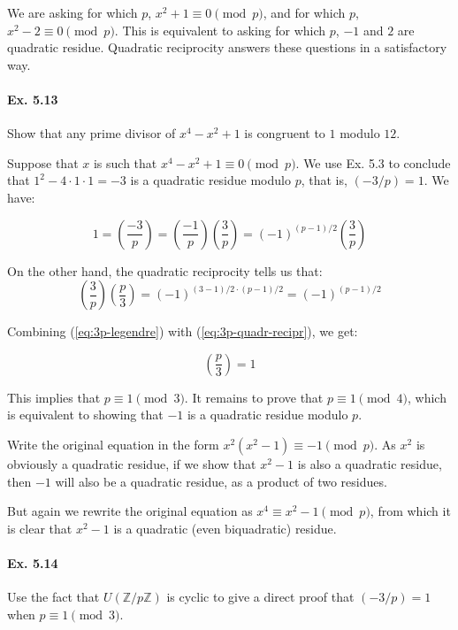 \documentclass[notitlepage]{article}
\theoremstyle{definition}
\newcommand\Z{\mathbb{Z}}
\begin{document}
We are asking for which $p$, $x^2 + 1 \equiv 0 \pmod p$, and for which
$p$, $x^2 - 2 \equiv 0 \pmod p$. This is equivalent to asking for
which $p$, $-1$ and $2$ are quadratic residue. Quadratic reciprocity
answers these questions in a satisfactory way.

\paragraph{Ex. 5.13}
Show that any prime divisor of $x^4 - x^2 + 1$ is congruent to $1$
modulo $12$.

Suppose that $x$ is such that $x^4 - x^2 + 1 \equiv 0 \pmod p$. We use
Ex. 5.3 to conclude that $1^2 - 4 \cdot 1 \cdot 1 = - 3$ is a
quadratic residue modulo $p$, that is, $(-3/p) = 1$. We have:

\begin{equation}
  \label{eq:3p-legendre}
  1 = \left(\frac{-3}{p}\right) =
  \left(\frac{-1}{p}\right)\left(\frac{3}{p}\right) = (-1)^{(p-1)/2}
  \left(\frac{3}{p}\right)
\end{equation}

On the other hand, the quadratic reciprocity tells us that:
\begin{equation}
  \label{eq:3p-quadr-recipr}
  \left(\frac{3}{p}\right) \left(\frac{p}{3}\right) = (-1)^{(3-1)/2 \cdot (p-1)/2} = (-1)^{(p-1)/2}
\end{equation}

Combining (\ref{eq:3p-legendre}) with (\ref{eq:3p-quadr-recipr}), we get:

\begin{equation}
  \left(\frac{p}{3}\right) = 1
\end{equation}

This implies that $p \equiv 1 \pmod 3$. It remains to prove that $p
\equiv 1 \pmod 4$, which is equivalent to showing that $-1$ is a
quadratic residue modulo $p$.

Write the original equation in the form $x^2(x^2 - 1) \equiv -1 \pmod
p$. As $x^2$ is obviously a quadratic residue, if we show that $x^2 -
1$ is also a quadratic residue, then $-1$ will also be a quadratic
residue, as a product of two residues.

But again we rewrite the original equation as $x^4 \equiv x^2 - 1
\pmod p$, from which it is clear that $x^2 - 1$ is a quadratic
(even biquadratic) residue.

\paragraph{Ex. 5.14}
Use the fact that $U(\Z/p\Z)$ is cyclic to give a direct proof that
$(-3/p) = 1$ when $p \equiv 1 \pmod 3$.
\end{document}
